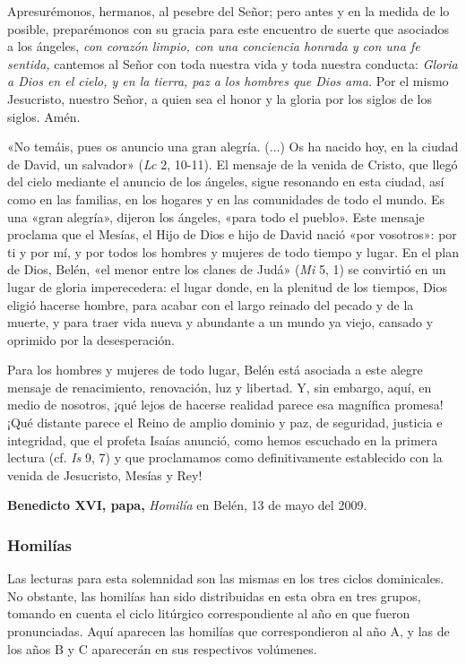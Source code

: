 \documentclass[]{article}
\begin{document}
Apresurémonos, hermanos, al pesebre del Señor; pero antes y en la medida
de lo posible, preparémonos con su gracia para este encuentro de suerte
que asociados a los ángeles, \emph{con corazón limpio, con una
conciencia honrada y con una fe sentida,} cantemos al Señor con toda
nuestra vida y toda nuestra conducta: \emph{Gloria a Dios en el cielo, y
en la tierra, paz a los hombres que Dios ama.} Por el mismo Jesucristo,
nuestro Señor, a quien sea el honor y la gloria por los siglos de los
siglos. Amén.

«No temáis, pues os anuncio una gran alegría. (...) Os ha nacido hoy, en
la ciudad de David, un salvador» (\emph{Lc} 2, 10-11). El mensaje de la
venida de Cristo, que llegó del cielo mediante el anuncio de los
ángeles, sigue resonando en esta ciudad, así como en las familias, en
los hogares y en las comunidades de todo el mundo. Es una «gran
alegría», dijeron los ángeles, «para todo el pueblo». Este mensaje
proclama que el Mesías, el Hijo de Dios e hijo de David nació «por
vosotros»: por ti y por mí, y por todos los hombres y mujeres de todo
tiempo y lugar. En el plan de Dios, Belén, «el menor entre los clanes de
Judá» (\emph{Mi} 5, 1) se convirtió en un lugar de gloria imperecedera:
el lugar donde, en la plenitud de los tiempos, Dios eligió hacerse
hombre, para acabar con el largo reinado del pecado y de la muerte, y
para traer vida nueva y abundante a un mundo ya viejo, cansado y
oprimido por la desesperación.

Para los hombres y mujeres de todo lugar, Belén está asociada a este
alegre mensaje de renacimiento, renovación, luz y libertad. Y, sin
embargo, aquí, en medio de nosotros, ¡qué lejos de hacerse realidad
parece esa magnífica promesa! ¡Qué distante parece el Reino de amplio
dominio y paz, de seguridad, justicia e integridad, que el profeta
Isaías anunció, como hemos escuchado en la primera lectura (cf.
\emph{Is} 9, 7) y que proclamamos como definitivamente establecido con
la venida de Jesucristo, Mesías y Rey!

\textbf{Benedicto XVI, papa,} \emph{Homilía} en Belén, 13 de mayo del
2009.

\protect\hypertarget{_Toc448662781}{}{\protect\hypertarget{_Toc448690300}{}{}}

\subsubsection{Homilías}\label{homiluxedas-5}

Las lecturas para esta solemnidad son las mismas en los tres ciclos
dominicales. No obstante, las homilías han sido distribuidas en esta
obra en tres grupos, tomando en cuenta el ciclo litúrgico
correspondiente al año en que fueron pronunciadas. Aquí aparecen las
homilías que correspondieron al año A, y las de los años B y C
aparecerán en sus respectivos volúmenes.
\end{document}
